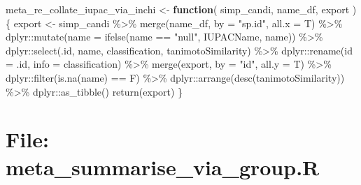 \documentclass[
]{article}
\newenvironment{Shaded}{\begin{snugshade}}{\end{snugshade}}
\newcommand{\AttributeTok}[1]{\textcolor[rgb]{0.77,0.63,0.00}{#1}}
\newcommand{\ControlFlowTok}[1]{\textcolor[rgb]{0.13,0.29,0.53}{\textbf{#1}}}
\newcommand{\FunctionTok}[1]{\textcolor[rgb]{0.00,0.00,0.00}{#1}}
\newcommand{\NormalTok}[1]{#1}
\newcommand{\OtherTok}[1]{\textcolor[rgb]{0.56,0.35,0.01}{#1}}
\newcommand{\SpecialCharTok}[1]{\textcolor[rgb]{0.00,0.00,0.00}{#1}}
\newcommand{\StringTok}[1]{\textcolor[rgb]{0.31,0.60,0.02}{#1}}
\begin{document}
\begin{Shaded}
\begin{Highlighting}[]
\NormalTok{meta\_re\_collate\_iupac\_via\_inchi }\OtherTok{\textless{}{-}} 
  \ControlFlowTok{function}\NormalTok{(}
\NormalTok{           simp\_candi,}
\NormalTok{           name\_df,}
\NormalTok{           export}
\NormalTok{           )\{}
\NormalTok{    export }\OtherTok{\textless{}{-}}\NormalTok{ simp\_candi }\SpecialCharTok{\%\textgreater{}\%}
      \FunctionTok{merge}\NormalTok{(name\_df, }\AttributeTok{by =} \StringTok{"sp.id"}\NormalTok{, }\AttributeTok{all.x =}\NormalTok{ T) }\SpecialCharTok{\%\textgreater{}\%}
\NormalTok{      dplyr}\SpecialCharTok{::}\FunctionTok{mutate}\NormalTok{(}\AttributeTok{name =} \FunctionTok{ifelse}\NormalTok{(name }\SpecialCharTok{==} \StringTok{"null"}\NormalTok{, IUPACName, name)) }\SpecialCharTok{\%\textgreater{}\%}
\NormalTok{      dplyr}\SpecialCharTok{::}\FunctionTok{select}\NormalTok{(.id, name, classification, tanimotoSimilarity) }\SpecialCharTok{\%\textgreater{}\%}
\NormalTok{      dplyr}\SpecialCharTok{::}\FunctionTok{rename}\NormalTok{(}\AttributeTok{id =}\NormalTok{ .id, }\AttributeTok{info =}\NormalTok{ classification) }\SpecialCharTok{\%\textgreater{}\%}
      \FunctionTok{merge}\NormalTok{(export, }\AttributeTok{by =} \StringTok{"id"}\NormalTok{, }\AttributeTok{all.y =}\NormalTok{ T) }\SpecialCharTok{\%\textgreater{}\%}
\NormalTok{      dplyr}\SpecialCharTok{::}\FunctionTok{filter}\NormalTok{(}\FunctionTok{is.na}\NormalTok{(name) }\SpecialCharTok{==}\NormalTok{ F) }\SpecialCharTok{\%\textgreater{}\%}
\NormalTok{      dplyr}\SpecialCharTok{::}\FunctionTok{arrange}\NormalTok{(}\FunctionTok{desc}\NormalTok{(tanimotoSimilarity)) }\SpecialCharTok{\%\textgreater{}\%}
\NormalTok{      dplyr}\SpecialCharTok{::}\FunctionTok{as\_tibble}\NormalTok{()}
    \FunctionTok{return}\NormalTok{(export)}
\NormalTok{  \}}
\end{Highlighting}
\end{Shaded}

\hypertarget{file-meta_summarise_via_group.r}{%
\section{File: meta\_summarise\_via\_group.R}\label{file-meta_summarise_via_group.r}}
\end{document}
